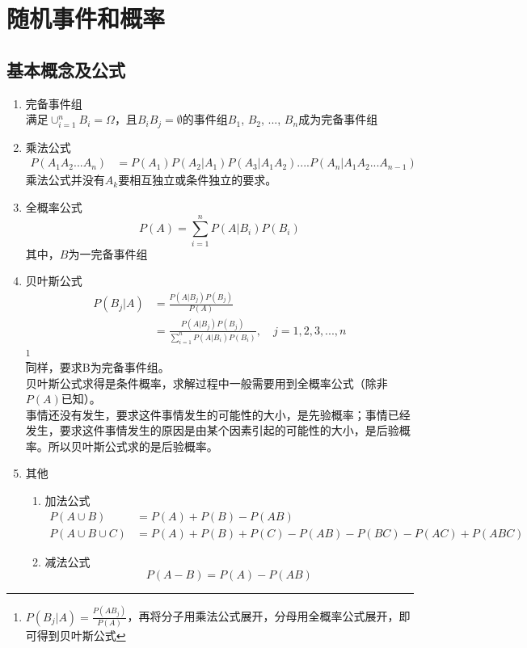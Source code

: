 \section{随机事件和概率}
\subsection{基本概念及公式}
\begin{enumerate}
	\item 完备事件组 \\
	满足$\cup_{i=1}^nB_i=\Omega$，且$B_iB_j = \emptyset$的事件组$B_1$, $B_2$, ..., $B_n$成为完备事件组
	\item 乘法公式
	\begin{align}
	P(A_1A_2...A_n) &= P(A_1)P(A_2|A_1)P(A_3|A_1A_2)....P(A_n|A_1A_2...A_{n-1})
	\end{align}
	乘法公式并没有$A_k$要相互独立或条件独立的要求。

	\item 全概率公式
	\begin{equation}
	P(A) = \sum_{i=1}^{n}P(A|B_i)P(B_i)
	\end{equation}
	其中，$B$为一完备事件组

	\item 贝叶斯公式
	\begin{align}
	P(B_j|A) &= \frac{P(A|B_j)P(B_j)}{P(A)} \\
	&= \frac{P(A|B_j)P(B_j)}{\sum_{i=1}^{n}P(A|B_i)P(B_i)},  \quad j = 1, 2, 3, ..., n
	\end{align}
	\footnote{$P(B_j|A)=\frac{P(AB_j)}{P(A)}$，再将分子用乘法公式展开，分母用全概率公式展开，即可得到贝叶斯公式} \\
	同样，要求B为完备事件组。 \\
	贝叶斯公式求得是条件概率，求解过程中一般需要用到全概率公式（除非$P(A)$已知）。 \\
	事情还没有发生，要求这件事情发生的可能性的大小，是先验概率；事情已经发生，要求这件事情发生的原因是由某个因素引起的可能性的大小，是后验概率。所以贝叶斯公式求的是后验概率。
	\item 其他
	\begin{enumerate}
		\item 加法公式
		\begin{align}
			P(A\cup B) &= P(A) + P(B) - P(AB) \\
			P(A\cup B\cup C) &= P(A)+P(B)+P(C)-P(AB)-P(BC)-P(AC) +P(ABC)
		\end{align}
		\item 减法公式
		\begin{equation}
			P(A-B) = P(A)-P(AB)
		\end{equation}
	\end{enumerate}
\end{enumerate}
